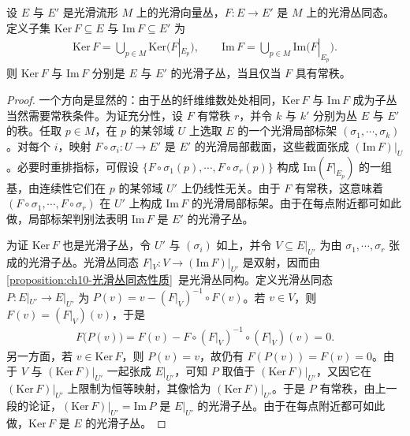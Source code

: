 \documentclass[../../main.tex]{subfiles}
\begin{document}
\begin{theorem}[常秩丛同态的核与像]\label{theorem:ch10-常秩丛同态}
设 $E$ 与 $E'$ 是光滑流形 $M$ 上的光滑向量丛，$F\colon E\to E'$ 是 $M$ 上的光滑丛同态。定义子集 $\mathrm{Ker}\,F\subseteq E$ 与 $\mathrm{Im}\,F\subseteq E'$ 为
\begin{align*}
\mathrm{Ker}\,F=\bigcup_{p\in M}\mathrm{Ker}\big(F|_{E_p}\big),\qquad
\mathrm{Im}\,F=\bigcup_{p\in M}\mathrm{Im}\big(F|_{E_p}\big).
\end{align*}
则 $\mathrm{Ker}\,F$ 与 $\mathrm{Im}\,F$ 分别是 $E$ 与 $E'$ 的光滑子丛，当且仅当 $F$ 具有常秩。
\end{theorem}

\begin{proof}
一个方向是显然的：由于丛的纤维维数处处相同，$\mathrm{Ker}\,F$ 与 $\mathrm{Im}\,F$ 成为子丛当然需要常秩条件。为证充分性，设 $F$ 有常秩 $r$，并令 $k$ 与 $k'$ 分别为丛 $E$ 与 $E'$ 的秩。任取 $p\in M$，在 $p$ 的某邻域 $U$ 上选取 $E$ 的一个光滑局部标架 $(\sigma_1,\cdots ,\sigma_k)$。对每个 $i$，映射 $F\circ\sigma_i\colon U\to E'$ 是 $E'$ 的光滑局部截面，这些截面张成 $(\mathrm{Im}\,F)|_U$。必要时重排指标，可假设 $\{F\circ\sigma_1(p),\cdots ,F\circ\sigma_r(p)\}$ 构成 $\mathrm{Im}(F|_{E_p})$ 的一组基，由连续性它们在 $p$ 的某邻域 $U'$ 上仍线性无关。由于 $F$ 有常秩，这意味着 $(F\circ\sigma_1,\cdots ,F\circ\sigma_r)$ 在 $U'$ 上构成 $\mathrm{Im}\,F$ 的光滑局部标架。由于在每点附近都可如此做，局部标架判别法表明 $\mathrm{Im}\,F$ 是 $E'$ 的光滑子丛。

为证 $\mathrm{Ker}\,F$ 也是光滑子丛，令 $U'$ 与 $(\sigma_i)$ 如上，并令 $V\subseteq E|_{U'}$ 为由 $\sigma_1,\cdots ,\sigma_r$ 张成的光滑子丛。光滑丛同态 $F|_V\colon V\to(\mathrm{Im}\,F)|_{U'}$ 是双射，因而由\cref{proposition:ch10-光滑丛同态性质}~是光滑丛同构。定义光滑丛同态 $P\colon E|_{U'}\to E|_{U'}$ 为 $P(v)=v-(F|_V)^{-1}\circ F(v)$。若 $v\in V$，则 $F(v)=(F|_V)(v)$，于是
\begin{align*}
F\big(P(v)\big)=F(v)-F\circ(F|_V)^{-1}\circ(F|_V)(v)=0.
\end{align*}
另一方面，若 $v\in\mathrm{Ker}\,F$，则 $P(v)=v$，故仍有 $F(P(v))=F(v)=0$。由于 $V$ 与 $(\mathrm{Ker}\,F)|_{U'}$ 一起张成 $E|_{U'}$，可知 $P$ 取值于 $(\mathrm{Ker}\,F)|_{U'}$，又因它在 $(\mathrm{Ker}\,F)|_{U'}$ 上限制为恒等映射，其像恰为 $(\mathrm{Ker}\,F)|_{U'}$。于是 $P$ 有常秩，由上一段的论证，$(\mathrm{Ker}\,F)|_{U'}=\mathrm{Im}\,P$ 是 $E|_{U'}$ 的光滑子丛。由于在每点附近都可如此做，$\mathrm{Ker}\,F$ 是 $E$ 的光滑子丛。
\end{proof}
\end{document}
